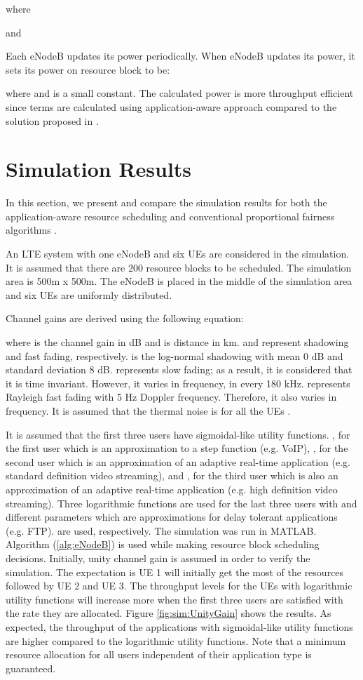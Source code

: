 \documentclass[journal]{IEEEtran} 				\IEEEoverridecommandlockouts 	\usepackage{amsmath,amssymb}
\begin{document}
where 

and


Each eNodeB updates its power periodically. When eNodeB  updates its power, it sets its power on resource block  to be:

where  and  is a small constant. The calculated power is more throughput efficient since  terms are calculated using application-aware approach  compared to the solution proposed in \cite{SelfOrganizedLTE}.

\section{Simulation Results}\label{sec:sim}

In this section, we present and compare the simulation results for both the application-aware resource scheduling and conventional proportional fairness algorithms \cite{SelfOrganizedLTE}. 

An LTE system with one eNodeB and six UEs are considered in the simulation. It is assumed that there are 200 resource blocks to be scheduled. The simulation area is 500m x 500m. The eNodeB is placed in the middle of the simulation area and six UEs are uniformly distributed.


Channel gains are derived using the following equation:

where  is the channel gain in dB and  is distance in km.  and  represent shadowing and fast fading, respectively.  is the log-normal shadowing with mean 0 dB and standard deviation 8 dB.  represents slow fading; as a result, it is considered that it is time invariant. However, it varies in frequency, in every 180 kHz.  represents Rayleigh fast fading with 5 Hz Doppler frequency. Therefore, it also varies in frequency. It is assumed that the thermal noise is  for all the UEs \cite{SelfOrganizedLTE}.

It is assumed that the first three users have sigmoidal-like utility functions. ,  for the first user which is an approximation to a step function (e.g. VoIP), ,  for the second user which is an approximation of an adaptive real-time application (e.g. standard definition video streaming), and ,  for the third user which is also an approximation of an adaptive real-time application (e.g. high definition video streaming). Three logarithmic functions are used for the last three users with  and different  parameters which are approximations for delay tolerant applications (e.g. FTP).  are used, respectively. The simulation was run in MATLAB. Algorithm (\ref{alg:eNodeB}) is used while making resource block scheduling decisions. Initially, unity channel gain is assumed in order to verify the simulation. The expectation is UE 1 will initially get the most of the resources followed by UE 2 and UE 3. The throughput levels for the UEs with logarithmic utility functions will increase more when the first three users are satisfied with the rate they are allocated. Figure \ref{fig:sim:UnityGain} shows the results. As expected, the throughput of the applications with sigmoidal-like utility functions are higher compared to the logarithmic utility functions. Note that a minimum
resource allocation for all users independent of their application type is guaranteed. 
\end{document}
